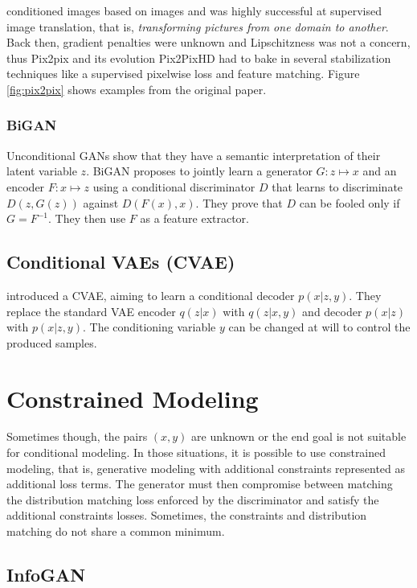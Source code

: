 \citet{pix2pix} conditioned images based on images and was highly successful at supervised image translation, that is, \emph{transforming pictures from one domain to another}. Back then, gradient penalties were unknown and Lipschitzness was not a concern, thus Pix2pix and its evolution Pix2PixHD \citep{pix2pixhd} had to bake in several stabilization techniques like a supervised pixelwise loss and feature matching. Figure \ref{fig:pix2pix} shows examples from the original paper.

\subsubsection{BiGAN}

Unconditional GANs show that they have a semantic interpretation of their latent variable $z$. BiGAN \citep{bigan} proposes to jointly learn a generator $G: z \mapsto x$ and an encoder $F: x \mapsto z$ using a conditional discriminator $D$ that learns to discriminate $D(z, G(z))$ against $D(F(x), x)$. They prove that $D$ can be fooled only if $G = F^{-1}$. They then use $F$ as a feature extractor.

\subsection{Conditional VAEs (CVAE)}

\citep{cvae} introduced a CVAE, aiming to learn a conditional decoder $p(x|z,y)$. They replace the standard VAE encoder $q(z|x)$ with $q(z|x, y)$ and decoder $p(x|z)$ with $p(x|z,y)$. The conditioning variable $y$ can be changed at will to control the produced samples.

\section{Constrained Modeling}

Sometimes though, the pairs $(x, y)$ are unknown or the end goal is not suitable for conditional modeling. In those situations, it is possible to use constrained modeling, that is, generative modeling with additional constraints represented as additional loss terms. The generator must then compromise between matching the distribution matching loss enforced by the discriminator and satisfy the additional constraints losses. Sometimes, the constraints and distribution matching do not share a common minimum.

\subsection{InfoGAN}

